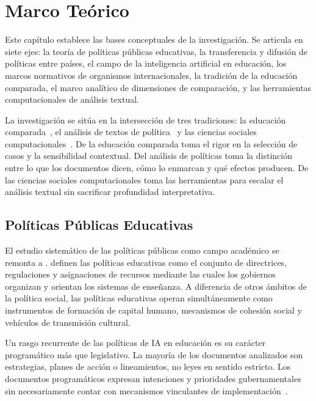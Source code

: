 
\chapter{Marco Teórico}
\label{cap:marco-teorico}

Este capítulo establece las bases conceptuales de la investigación. Se articula en siete ejes: la teoría de políticas públicas educativas, la transferencia y difusión de políticas entre países, el campo de la inteligencia artificial en educación, los marcos normativos de organismos internacionales, la tradición de la educación comparada, el marco analítico de dimensiones de comparación, y las herramientas computacionales de análisis textual.

La investigación se sitúa en la intersección de tres tradiciones: la educación comparada~\citep{bray1995levels}, el análisis de textos de política~\citep{rizvi2010globalizing} y las ciencias sociales computacionales~\citep{grimmer2022text}. De la educación comparada toma el rigor en la selección de casos y la sensibilidad contextual. Del análisis de políticas toma la distinción entre lo que los documentos dicen, cómo lo enmarcan y qué efectos producen. De las ciencias sociales computacionales toma las herramientas para escalar el análisis textual sin sacrificar profundidad interpretativa.


\section{Políticas Públicas Educativas}
\label{sec:politicas-publicas}

El estudio sistemático de las políticas públicas como campo académico se remonta a \citet{lasswell1951policy}. \citet{rizvi2010globalizing} definen las políticas educativas como el conjunto de directrices, regulaciones y asignaciones de recursos mediante las cuales los gobiernos organizan y orientan los sistemas de enseñanza. A diferencia de otros ámbitos de la política social, las políticas educativas operan simultáneamente como instrumentos de formación de capital humano, mecanismos de cohesión social y vehículos de transmisión cultural.

Un rasgo recurrente de las políticas de IA en educación es su carácter programático más que legislativo. La mayoría de los documentos analizados son estrategias, planes de acción o lineamientos, no leyes en sentido estricto. Los documentos programáticos expresan intenciones y prioridades gubernamentales sin necesariamente contar con mecanismos vinculantes de implementación~\citep{fatima2020aipolicy}.

